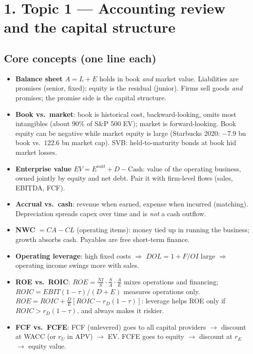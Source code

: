 \documentclass[10pt,a4paper]{article}
\newcommand{\blk}[1]{\subsection*{\color{hd}#1}}
\begin{document}
\section*{1. Topic 1 --- Accounting review and the capital structure}

\blk{Core concepts (one line each)}
\begin{itemize}
  \item \textbf{Balance sheet} $A=L+E$ holds in book \emph{and} market value. Liabilities are
        promises (senior, fixed); equity is the residual (junior). Firms sell goods \emph{and}
        promises; the promise side is the capital structure.
  \item \textbf{Book vs.\ market}: book is historical cost, backward-looking, omits most intangibles
        (about 90\% of S\&P 500 EV); market is forward-looking. Book equity can be negative while
        market equity is large (Starbucks 2020: $-7.9$ bn book vs.\ $122.6$ bn market cap).
        SVB: held-to-maturity bonds at book hid market losses.
  \item \textbf{Enterprise value} $EV=E^{mkt}+D-\text{Cash}$: value of the operating business,
        owned jointly by equity and net debt. Pair it with firm-level flows (sales, EBITDA, FCF).
  \item \textbf{Accrual vs.\ cash}: revenue when earned, expense when incurred (matching).
        Depreciation spreads capex over time and is \emph{not} a cash outflow.
  \item \textbf{NWC} $=CA-CL$ (operating items): money tied up in running the business; growth
        absorbs cash. Payables are free short-term finance.
  \item \textbf{Operating leverage}: high fixed costs $\Rightarrow$ $DOL=1+F/OI$ large $\Rightarrow$
        operating income swings more with sales.
  \item \textbf{ROE vs.\ ROIC}: $ROE=\frac{NI}{S}\cdot\frac SA\cdot\frac AE$ mixes operations and
        financing; $ROIC=EBIT(1-\tau)/(D+E)$ measures operations only.
        $ROE=ROIC+\frac DE[ROIC-r_D(1-\tau)]$: leverage helps ROE only if $ROIC>r_D(1-\tau)$, and
        always makes it riskier.
  \item \textbf{FCF vs.\ FCFE}: FCF (unlevered) goes to all capital providers $\to$ discount at WACC
        (or $r_U$ in APV) $\to$ EV. FCFE goes to equity $\to$ discount at $r_E$ $\to$ equity value.
\end{itemize}
\end{document}
